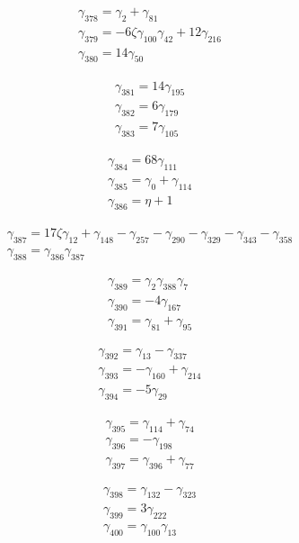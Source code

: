 \[\begin{aligned}\gamma_{378}=\gamma_{2} + \gamma_{81}\\ \gamma_{379}=- 6 \zeta  \gamma_{100} \gamma_{42} + 12 \gamma_{216}\\ \gamma_{380}=14 \gamma_{50}\end{aligned}\]

\[\begin{aligned}\gamma_{381}=14 \gamma_{195}\\ \gamma_{382}=6 \gamma_{179}\\ \gamma_{383}=7 \gamma_{105}\end{aligned}\]

\[\begin{aligned}\gamma_{384}=68 \gamma_{111}\\ \gamma_{385}=\gamma_{0} + \gamma_{114}\\ \gamma_{386}=\eta  + 1\end{aligned}\]

\[\begin{aligned}\gamma_{387}=17 \zeta  \gamma_{12} + \gamma_{148} - \gamma_{257} - \gamma_{290} - \gamma_{329} - \gamma_{343} - \gamma_{358}\\ \gamma_{388}=\gamma_{386} \gamma_{387}\end{aligned}\]

\[\begin{aligned}\gamma_{389}=\gamma_{2} \gamma_{388} \gamma_{7}\\ \gamma_{390}=- 4 \gamma_{167}\\ \gamma_{391}=\gamma_{81} + \gamma_{95}\end{aligned}\]

\[\begin{aligned}\gamma_{392}=\gamma_{13} - \gamma_{337}\\ \gamma_{393}=- \gamma_{160} + \gamma_{214}\\ \gamma_{394}=- 5 \gamma_{29}\end{aligned}\]

\[\begin{aligned}\gamma_{395}=\gamma_{114} + \gamma_{74}\\ \gamma_{396}=- \gamma_{198}\\ \gamma_{397}=\gamma_{396} + \gamma_{77}\end{aligned}\]

\[\begin{aligned}\gamma_{398}=\gamma_{132} - \gamma_{323}\\ \gamma_{399}=3 \gamma_{222}\\ \gamma_{400}=\gamma_{100} \gamma_{13}\end{aligned}\]

